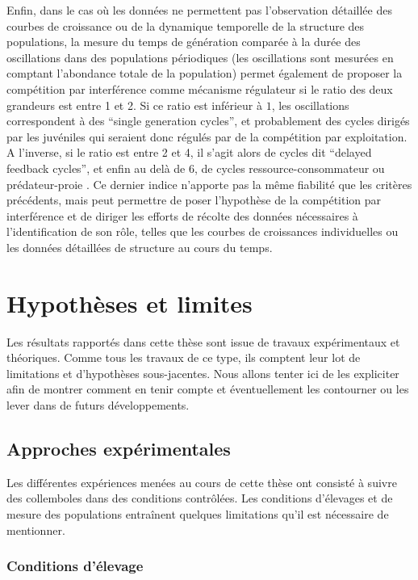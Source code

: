 Enfin, dans le cas où les données ne permettent pas l'observation détaillée des
courbes de croissance ou de la dynamique temporelle de la structure des
populations, la mesure du temps de génération comparée à la durée des
oscillations dans des populations périodiques (les oscillations sont mesurées en
comptant l'abondance totale de la population) permet également de proposer la
compétition par interférence comme mécanisme régulateur si le ratio des deux
grandeurs est entre 1 et 2. Si ce ratio est inférieur à $1$, les oscillations
correspondent à des ``single generation cycles'', et probablement des cycles
dirigés par les juvéniles qui seraient donc régulés par de la compétition par
exploitation. A l'inverse, si le ratio est entre 2 et 4, il s'agit alors de
cycles dit ``delayed feedback cycles'', et enfin au delà de 6, de cycles
ressource-consommateur ou prédateur-proie \autocites{murdoch2002a}. Ce dernier
indice n'apporte pas la même fiabilité que les critères précédents, mais peut
permettre de poser l'hypothèse de la compétition par interférence et de diriger
les efforts de récolte des données nécessaires à l'identification de son rôle,
telles que les courbes de croissances individuelles ou les données détaillées de
structure au cours du temps.

\section{Hypothèses et limites}

Les résultats rapportés dans cette thèse sont issue de travaux expérimentaux et
théoriques. Comme tous les travaux de ce type, ils comptent leur lot de
limitations et d'hypothèses sous-jacentes. Nous allons tenter ici de les
expliciter afin de montrer comment en tenir compte et éventuellement les
contourner ou les lever dans de futurs développements.

\subsection{Approches expérimentales}

Les différentes expériences menées au cours de cette thèse ont consisté à
suivre des collemboles dans des conditions contrôlées. Les conditions d'élevages et de
mesure des populations entraînent quelques limitations qu'il est nécessaire de
mentionner.

\subsubsection{Conditions d'élevage}

